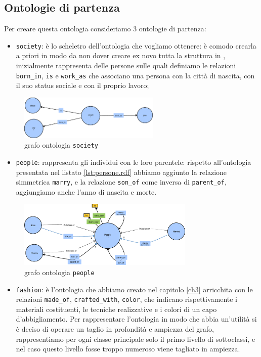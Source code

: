 \subsection{Ontologie di partenza}
Per creare questa ontologia consideriamo 3 ontologie di partenza:
\begin{itemize}
	\item \verb|society|: è lo scheletro dell'ontologia che vogliamo ottenere: è comodo crearla a priori in modo da non dover creare ex novo tutta la struttura in \cduce, inizialmente rappresenta delle persone sulle quali definiamo le relazioni \verb|born_in|, \verb|is| e \verb|work_as| che associano una persona con la città di nascita, con il suo status sociale e con il proprio lavoro;
\end{itemize}
\begin{figure}[H]
	\centering
	\includegraphics[width=0.6\textwidth]{Picture/society.rdf.pdf}
	\caption{grafo ontologia \texttt{society}}
\end{figure}
\begin{itemize}
	\item \verb|people|: rappresenta gli individui con le loro parentele: rispetto all'ontologia presentata nel listato \ref{lst:persone.rdf} abbiamo aggiunto la relazione simmetrica \verb|marry|, e la relazione \verb|son_of| come inversa di \verb|parent_of|, aggiungiamo anche l'anno di nascita e morte.
\end{itemize}
\begin{figure}[H]
	\centering
	\includegraphics[width=0.75\textwidth]{Picture/people.2.pdf}
	\caption{grafo ontologia \texttt{people}}
\end{figure}
\label{ont_fashion}
\begin{itemize}
	\item \verb|fashion|: è l'ontologia che abbiamo creato nel capitolo \ref{ch3} arricchita con le relazioni \verb|made_of|, \verb|crafted_with|, \verb|color|, che indicano rispettivamente i materiali costituenti, le tecniche realizzative e i colori di un capo d'abbigliamento. Per rappresentare l'ontologia in modo che abbia un'utilità si è deciso di operare un taglio in profondità e ampiezza del grafo, rappresentiamo per ogni classe principale solo il primo livello di sottoclassi, e nel caso questo livello fosse troppo numeroso viene tagliato in ampiezza.
\end{itemize}

